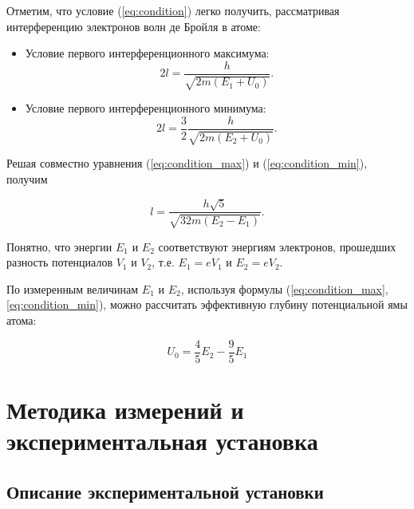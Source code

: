 \documentclass[a4paper, 12pt]{article}
\begin{document}
    Отметим, что условие (\ref{eq:condition}) легко получить, рассматривая интерференцию электронов волн де Бройля в атоме:
    
    \begin{itemize}
        \item Условие первого интерференционного максимума:
            \begin{equation}
                \label{eq:condition_max}
                2l = \frac{h}{\sqrt{2m (E_1 + U_0)}}.
            \end{equation}
        \item Условие первого интерференционного минимума:
            \begin{equation}
                \label{eq:condition_min}
                2l =\frac{3}{2} \frac{h}{\sqrt{2m (E_2 + U_0)}}.
            \end{equation}			
    \end{itemize}

    Решая совместно уравнения (\ref{eq:condition_max}) и (\ref{eq:condition_min}), получим
	
    \begin{equation}
        \label{eq:l}
	l = \frac{h\sqrt{5}}{\sqrt{32m(E_2-E_1)}}.
    \end{equation}
	
    Понятно, что энергии $E_1$ и $E_2$ соответствуют энергиям электронов, прошедших разность потенциалов $V_1$ и $V_2$, т.е. $E_1 = eV_1$ и $E_2 = eV_2$. 
	
    По измеренным величинам $E_1$ и $E_2$, используя формулы (\ref{eq:condition_max}, \ref{eq:condition_min}), можно рассчитать эффективную глубину потенциальной ямы атома:
	
    \begin{equation}
        \label{eq:U_0}
        U_0 = \frac{4}{5}E_2 - \frac{9}{5}E_1
    \end{equation}
    
    \newpage
    
    \section{Методика измерений и экспериментальная установка}

    \subsection{Описание экспериментальной установки}
\end{document}
